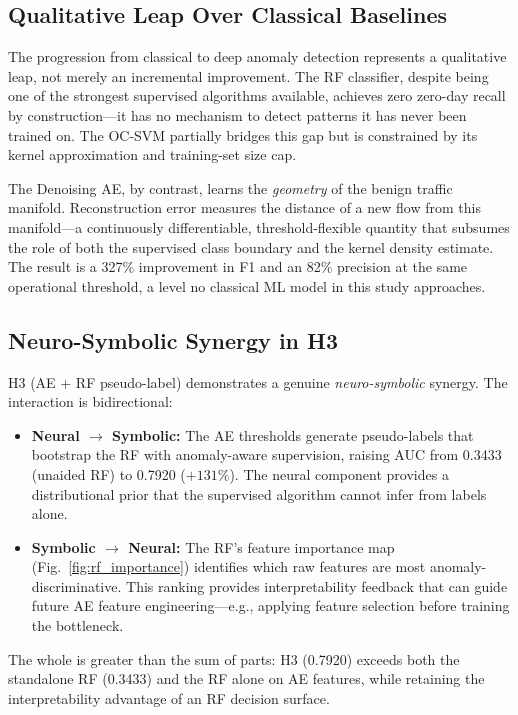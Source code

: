 \documentclass[10pt,journal,compsoc]{IEEEtran}
\begin{document}
\subsection{Qualitative Leap Over Classical Baselines}

The progression from classical to deep anomaly detection represents
a qualitative leap, not merely an incremental improvement.  The RF
classifier, despite being one of the strongest supervised algorithms
available, achieves zero zero-day recall by construction---it has no
mechanism to detect patterns it has never been trained on.  The
OC-SVM partially bridges this gap but is constrained by its kernel
approximation and training-set size cap.

The Denoising AE, by contrast, learns the \emph{geometry} of the
benign traffic manifold.  Reconstruction error measures the distance
of a new flow from this manifold---a continuously differentiable,
threshold-flexible quantity that subsumes the role of both the
supervised class boundary and the kernel density estimate.  The result
is a 327\% improvement in F1 and an 82\% precision at the same
operational threshold, a level no classical ML model in this study
approaches.

\subsection{Neuro-Symbolic Synergy in H3}

H3 (AE + RF pseudo-label) demonstrates a genuine \emph{neuro-symbolic}
synergy.  The interaction is bidirectional:

\begin{itemize}[leftmargin=*,noitemsep]
  \item \textbf{Neural $\to$ Symbolic:} The AE thresholds generate
    pseudo-labels that bootstrap the RF with anomaly-aware supervision,
    raising AUC from 0.3433 (unaided RF) to 0.7920 ($+131\%$).  The
    neural component provides a distributional prior that the supervised
    algorithm cannot infer from labels alone.
  \item \textbf{Symbolic $\to$ Neural:} The RF's feature importance
    map (Fig.~\ref{fig:rf_importance}) identifies which raw features
    are most anomaly-discriminative.  This ranking provides
    interpretability feedback that can guide future AE feature
    engineering---e.g., applying feature selection before training
    the bottleneck.
\end{itemize}

The whole is greater than the sum of parts: H3 (0.7920) exceeds both
the standalone RF (0.3433) and the RF alone on AE features, while
retaining the interpretability advantage of an RF decision surface.
\end{document}
